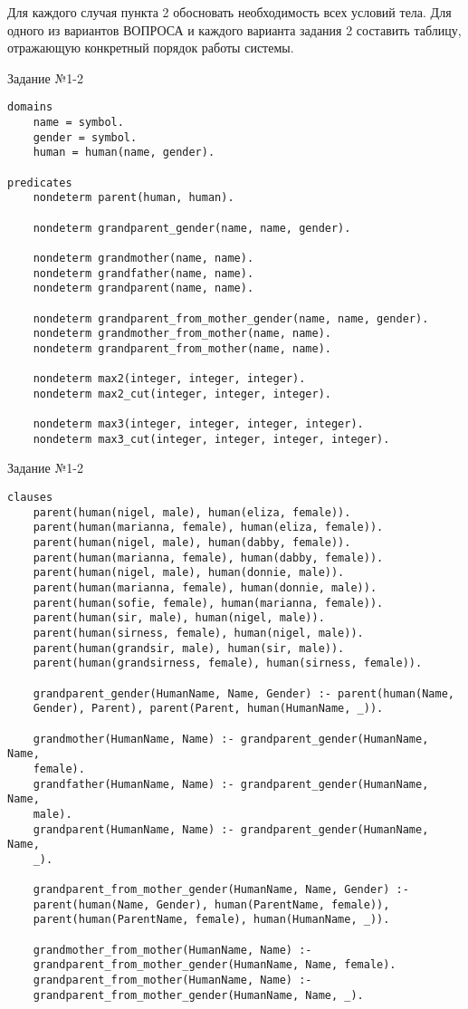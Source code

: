 Для каждого случая пункта 2 обосновать необходимость всех условий тела. Для одного из вариантов ВОПРОСА и каждого варианта задания 2 составить таблицу, отражающую конкретный порядок работы системы.
  
\begin{code}
\caption{Задание №1-2}
\label{code:bf1}
\begin{verbatim}
domains
	name = symbol.
	gender = symbol.
	human = human(name, gender).
	
predicates
	nondeterm parent(human, human).
	
	nondeterm grandparent_gender(name, name, gender).
	
	nondeterm grandmother(name, name).
	nondeterm grandfather(name, name).
	nondeterm grandparent(name, name).
	
	nondeterm grandparent_from_mother_gender(name, name, gender).
	nondeterm grandmother_from_mother(name, name).
	nondeterm grandparent_from_mother(name, name).
	
	nondeterm max2(integer, integer, integer).
	nondeterm max2_cut(integer, integer, integer).
	
	nondeterm max3(integer, integer, integer, integer).
	nondeterm max3_cut(integer, integer, integer, integer).
\end{verbatim}
\end{code}

\newpage

\begin{code}
\caption{Задание №1-2}
\label{code:bf2}
\begin{verbatim}		
clauses
	parent(human(nigel, male), human(eliza, female)).
	parent(human(marianna, female), human(eliza, female)).
	parent(human(nigel, male), human(dabby, female)).
	parent(human(marianna, female), human(dabby, female)).
	parent(human(nigel, male), human(donnie, male)).
	parent(human(marianna, female), human(donnie, male)).		  
	parent(human(sofie, female), human(marianna, female)).
	parent(human(sir, male), human(nigel, male)).
	parent(human(sirness, female), human(nigel, male)).
	parent(human(grandsir, male), human(sir, male)).
	parent(human(grandsirness, female), human(sirness, female)).
	
	grandparent_gender(HumanName, Name, Gender) :- parent(human(Name,
	Gender), Parent), parent(Parent, human(HumanName, _)).
	
	grandmother(HumanName, Name) :- grandparent_gender(HumanName, Name,
	female).
	grandfather(HumanName, Name) :- grandparent_gender(HumanName, Name, 
	male).
	grandparent(HumanName, Name) :- grandparent_gender(HumanName, Name, 
	_).
	
	grandparent_from_mother_gender(HumanName, Name, Gender) :- 
	parent(human(Name, Gender), human(ParentName, female)), 
	parent(human(ParentName, female), human(HumanName, _)).
	
	grandmother_from_mother(HumanName, Name) :- 
	grandparent_from_mother_gender(HumanName, Name, female).
	grandparent_from_mother(HumanName, Name) :- 
	grandparent_from_mother_gender(HumanName, Name, _).
\end{verbatim}
\end{code}

